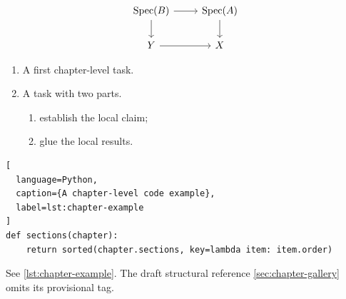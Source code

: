 \documentclass[sectionlevel=chapter,status=draft]{noteformyself}
\begin{document}
\[
\begin{tikzcd}
  \operatorname{Spec}(B) \arrow[r] \arrow[d] & \operatorname{Spec}(A) \arrow[d] \\
  Y \arrow[r] & X
\end{tikzcd}
\]

\begin{enumerate}
  \item A first chapter-level task.
  \item A task with two parts.
    \begin{enumerate}
      \item establish the local claim;
      \item glue the local results.
    \end{enumerate}
\end{enumerate}

\begin{lstlisting}[
  language=Python,
  caption={A chapter-level code example},
  label=lst:chapter-example
]
def sections(chapter):
    return sorted(chapter.sections, key=lambda item: item.order)
\end{lstlisting}

See \cref{lst:chapter-example}. The draft structural reference
\cref{sec:chapter-gallery} omits its provisional tag.
\end{document}
